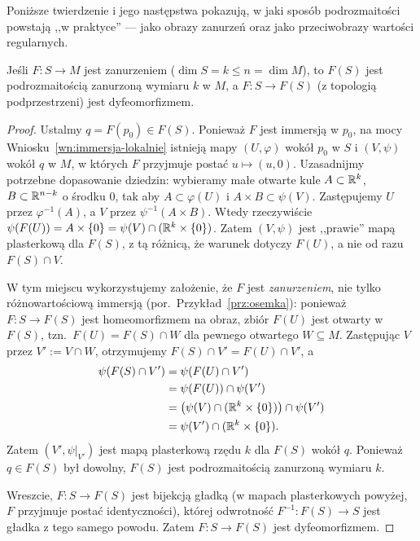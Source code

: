 Poniższe twierdzenie i jego następstwa pokazują, w jaki sposób podrozmaitości powstają ,,w
praktyce'' — jako obrazy zanurzeń oraz jako przeciwobrazy wartości regularnych.

\begin{twierdzenie}\label{tw:obraz}
Jeśli $F\colon S\to M$ jest zanurzeniem ($\dim S=k\leq n=\dim M$), to $F(S)$ jest
podrozmaitością zanurzoną wymiaru $k$ w $M$, a $F\colon S\to F(S)$ (z topologią
podprzestrzeni) jest dyfeomorfizmem.
\end{twierdzenie}
\begin{proof}
Ustalmy $q=F(p_0)\in F(S)$. Ponieważ $F$ jest immersją w $p_0$, na mocy
Wniosku~\ref{wn:immersja-lokalnie} istnieją mapy $(U,\varphi)$ wokół $p_0$ w $S$ i
$(V,\psi)$ wokół $q$ w $M$, w których $F$ przyjmuje postać $u\mapsto(u,0)$.
Uzasadnijmy potrzebne dopasowanie dziedzin: wybieramy małe otwarte
kule $A\subset\mathbb{R}^k$, $B\subset\mathbb{R}^{n-k}$ o środku $0$, tak aby
$A\subset\varphi(U)$ i $A\times B\subset\psi(V)$.
Zastępujemy $U$ przez $\varphi^{-1}(A)$, a $V$ przez
$\psi^{-1}(A\times B)$. Wtedy rzeczywiście
$\psi(F(U))=A\times\{0\}=\psi(V)\cap(\mathbb{R}^k\times\{0\})$.
Zatem $(V,\psi)$ jest ,,prawie'' mapą
plasterkową dla $F(S)$, z tą różnicą, że warunek dotyczy $F(U)$, a nie od razu $F(S)\cap V$.

W tym miejscu wykorzystujemy założenie, że $F$ jest \emph{zanurzeniem}, nie tylko
różnowartościową immersją (por.\ Przykład~\ref{prz:osemka}): ponieważ $F\colon S\to F(S)$
jest homeomorfizmem na obraz, zbiór $F(U)$ jest otwarty w $F(S)$, tzn.\ $F(U)=F(S)\cap W$
dla pewnego otwartego $W\subseteq M$. Zastępując $V$ przez $V':=V\cap W$, otrzymujemy
$F(S)\cap V'=F(U)\cap V'$, a
\begin{align*}
\psi(F(S)\cap V')
 &=\psi(F(U)\cap V')\\
 &=\psi(F(U))\cap\psi(V')\\
 &=\big(\psi(V)\cap(\mathbb{R}^k\times\{0\})\big)\cap\psi(V')\\
 &=\psi(V')\cap(\mathbb{R}^k\times\{0\}).
\end{align*}
Zatem $(V',\psi|_{V'})$ jest mapą plasterkową rzędu $k$ dla $F(S)$ wokół $q$. Ponieważ
$q\in F(S)$ był dowolny, $F(S)$ jest podrozmaitością zanurzoną wymiaru $k$.

Wreszcie, $F\colon S\to F(S)$ jest bijekcją gładką (w mapach plasterkowych powyżej, $F$
przyjmuje postać identyczności), której odwrotność $F^{-1}\colon F(S)\to S$ jest gładka z
tego samego powodu. Zatem $F\colon S\to F(S)$ jest dyfeomorfizmem.
\end{proof}

